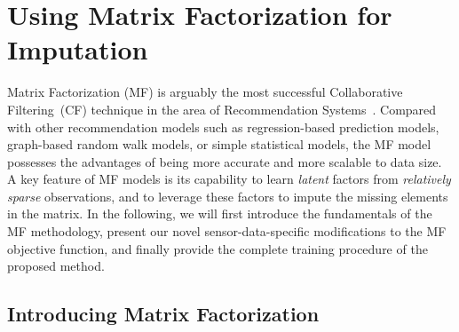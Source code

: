 \section{Using Matrix Factorization for Imputation}  \label{sec:mf}


Matrix Factorization (MF) is arguably the most successful Collaborative Filtering~(CF) technique in the area of Recommendation Systems~\cite{koren2009matrix, chen2011linear}. Compared with other recommendation models such as regression-based prediction models, graph-based random walk models, or simple statistical models, the MF model possesses the advantages of being more accurate and more scalable to data size.
A key feature of MF models is its capability to learn {\em latent} factors from {\em relatively sparse} observations, and to leverage these factors to impute the missing elements in the matrix.
In the following, we will first introduce the fundamentals of the MF methodology, present our novel sensor-data-specific 
modifications to the MF objective function, and finally provide the complete training procedure of the proposed method.

\subsection{Introducing Matrix Factorization}

